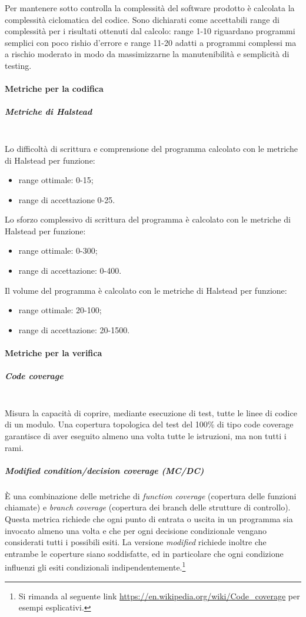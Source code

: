 Per mantenere sotto controlla la complessità del software prodotto è calcolata la complessità ciclomatica del codice. 
Sono dichiarati come accettabili range di complessità per i risultati ottenuti dal calcolo: range 1-10 riguardano programmi semplici con poco rishio d'errore e range 11-20 adatti a programmi complessi ma a rischio moderato in modo da massimizzarne la manutenibilità e semplicità di testing.

\paragraph{Metriche per la codifica}\mbox{}
\subparagraph{Metriche di Halstead}\mbox{}\\

Lo difficoltà di scrittura e comprensione del programma calcolato con le metriche di Halstead per funzione:
\begin{itemize}
	\item range ottimale: 0-15;
	\item range di accettazione 0-25.
\end{itemize}

Lo sforzo complessivo di scrittura del programma è calcolato con le metriche di Halstead per funzione:
\begin{itemize}
	\item range ottimale: 0-300;
	\item range di accettazione: 0-400.
\end{itemize}

Il volume del programma è calcolato con le metriche di Halstead per funzione:
\begin{itemize}
	\item range ottimale: 20-100;
	\item range di accettazione: 20-1500.
\end{itemize}

\paragraph{Metriche per la verifica}\mbox{}
\subparagraph{Code coverage}\mbox{}\\
Misura la capacità di coprire, mediante esecuzione di test, tutte le linee di codice di un modulo. Una copertura topologica del test del 100\% di tipo code coverage garantisce di aver eseguito almeno una volta tutte le istruzioni, ma non tutti i rami.

\subparagraph{Modified condition/decision coverage (MC/DC)}
\`{E} una combinazione delle metriche di \textit{function coverage} (copertura delle funzioni chiamate) e \textit{branch coverage} (copertura dei branch delle strutture di controllo). Questa metrica richiede che ogni punto di entrata o uscita in un programma sia invocato almeno una volta e che per ogni decisione condizionale vengano considerati tutti i possibili esiti. La versione \textit{modified} richiede inoltre che entrambe le coperture siano soddisfatte, ed in particolare che ogni condizione influenzi gli esiti condizionali indipendentemente.\footnote{Si rimanda al seguente link \url{https://en.wikipedia.org/wiki/Code_coverage} per esempi esplicativi.}

